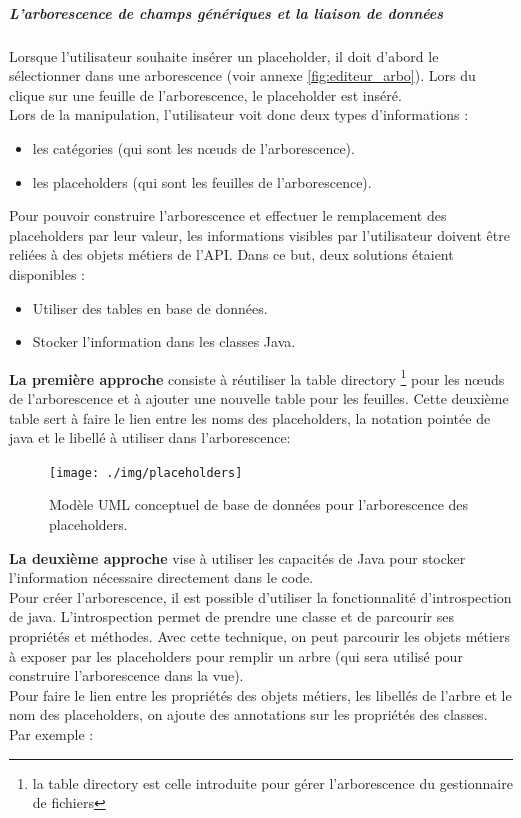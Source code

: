 \subparagraph*{L'arborescence de champs génériques et la liaison de données}

Lorsque l'utilisateur souhaite insérer un placeholder, il doit d'abord le sélectionner dans une arborescence (voir annexe \ref{fig:editeur_arbo}). 
Lors du clique sur une feuille de l'arborescence, le placeholder est inséré.  \\

Lors de la manipulation, l'utilisateur voit donc deux types d'informations : 
\begin{itemize}
\item les catégories (qui sont les nœuds de l'arborescence).
\item les placeholders (qui sont les feuilles de l'arborescence).
\end{itemize}

Pour pouvoir construire l'arborescence et effectuer le remplacement des placeholders par leur valeur, les informations visibles par l'utilisateur doivent être reliées à des objets métiers de l'API.
Dans ce but, deux solutions étaient disponibles : 
\begin{itemize}
\item Utiliser des tables en base de données.
\item Stocker l'information dans les classes Java. %
\end{itemize}

\textbf{La première approche} consiste à réutiliser la table directory \footnote{la table directory est celle introduite pour gérer l'arborescence du gestionnaire de fichiers} pour les nœuds de l'arborescence et à ajouter une nouvelle table pour les feuilles. Cette deuxième table sert à faire le lien entre les noms des placeholders, la notation pointée de java et le libellé à utiliser dans l'arborescence:\\

\begin{figure}[H]
  \centering
  \texttt{[image: ./img/placeholders]}
  \caption{\label{fig:mb_va_ast} Modèle UML conceptuel de base de données pour l'arborescence des placeholders.}
\end{figure}


\textbf{La deuxième approche} vise à utiliser les capacités de Java pour stocker l'information nécessaire directement dans le code.\\
Pour créer l'arborescence, il est possible d'utiliser la fonctionnalité d'introspection de java. L'introspection permet de prendre une classe et de parcourir ses propriétés et méthodes. Avec cette technique, on peut parcourir les objets métiers à exposer par les placeholders pour remplir un arbre (qui sera utilisé pour construire l'arborescence dans la vue). \\
Pour faire le lien entre les propriétés des objets métiers, les libellés de l'arbre et le nom des placeholders, on ajoute des annotations sur les propriétés des classes.\\
Par exemple :

